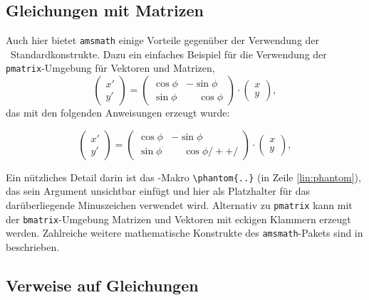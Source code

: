 \subsection{Gleichungen mit Matrizen}

Auch hier bietet \texttt{amsmath} einige Vorteile gegenüber der Verwendung
der \latex\ Standardkonstrukte. Dazu ein einfaches Beispiel für die
Verwendung der \texttt{pmatrix}-Umgebung für Vektoren und Matrizen,
%
\begin{equation}
	\begin{pmatrix}
		x' \\ y'
	\end{pmatrix}
	=
	\begin{pmatrix}
		\cos \phi & -\sin \phi           \\
		\sin \phi & \phantom{-}\cos \phi
	\end{pmatrix}
	\cdot
	\begin{pmatrix}
		x \\ y
	\end{pmatrix} ,
\end{equation}
%
das mit den folgenden Anweisungen erzeugt wurde:
%
\begin{LaTeXCode}
\begin{equation}
	\begin{pmatrix} 
			x' \\ 
			y' 
	\end{pmatrix}
	= 
	\begin{pmatrix}
		  \cos \phi &          -\sin \phi \\
		  \sin \phi & \phantom{-}\cos \phi /+ \label{lin:phantom} +/
	\end{pmatrix} 
	\cdot
	\begin{pmatrix} 
			x \\ 
			y 
	\end{pmatrix} ,
\end{equation}
\end{LaTeXCode}
%
Ein nützliches Detail darin ist das \tex-Makro \verb!\phantom{..}! (in Zeile
\ref{lin:phantom}), das sein Argument unsichtbar einfügt und hier als
Platzhalter für das darüberliegende Minuszeichen verwendet wird. Alternativ
zu \texttt{pmatrix} kann mit der \texttt{bmatrix}-Umgebung Matrizen und
Vektoren mit eckigen Klammern erzeugt werden. Zahlreiche weitere
mathematische Konstrukte des \texttt{amsmath}-Pakets sind in
\cite{Mittelbach2022} beschrieben.


\subsection{Verweise auf Gleichungen}
\label{sec:VerweiseAufGleichungen}

